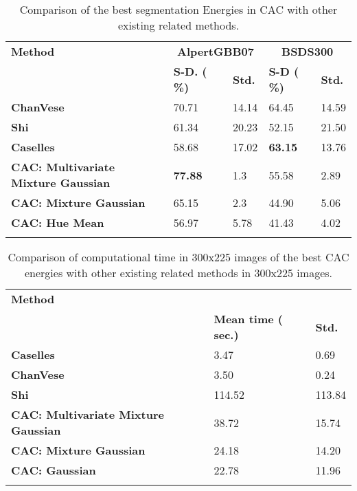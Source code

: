 \begin{table}[h!]
	\centering
	\begin{tabular}{lllll}
		\toprule
		\textbf{Method} & \multicolumn{2}{c}{\textbf{AlpertGBB07}} & \multicolumn{2}{c}{\textbf{BSDS300}} \\
		& \textbf{S-D. ( \%)} & \textbf{Std.}  & \textbf{S-D ( \%)} & \textbf{Std.}  \\ \midrule
		\textbf{ChanVese} & 70.71 & 14.14 &  64.45  &  14.59 \\
		\textbf{Shi} & 61.34 & 20.23 &  52.15  & 21.50\\
		\textbf{Caselles} & 58.68 & 17.02 &  \textbf{63.15}  &  13.76 \\
		\textbf{CAC: Multivariate Mixture Gaussian} & \textbf{77.88}& 1.3    &     55.58  &  2.89     \\
		\textbf{CAC: Mixture Gaussian} &  65.15 &   2.3    &  44.90  &  5.06  \\
		\textbf{CAC: Hue Mean} & 56.97 & 5.78 & 41.43  & 4.02 \\
		\vspace{0.5em}
	\end{tabular}
	\caption{Comparison of the best segmentation Energies in CAC with other existing related methods.}
	\label{table:results}
\end{table}

\begin{table}[h!]
	\centering
	\begin{tabular}{lll}
		\toprule
		\textbf{Method}& & \\
		& \textbf{Mean time ( sec.)} & \textbf{Std.}   \\ \midrule
		\textbf{Caselles} & 3.47 & 0.69 \\ %
		\textbf{ChanVese} & 3.50 & 0.24 \\ %
		\textbf{Shi} & 114.52 & 113.84  \\ %
		\textbf{CAC: Multivariate Mixture Gaussian} & 38.72 & 15.74 \\
		\textbf{CAC: Mixture Gaussian} & 24.18 & 14.20 \\ 
		\textbf{CAC: Gaussian} & 22.78 & 11.96 \\
		\vspace{0.5em}
	\end{tabular}
	\caption{Comparison of computational time  in 300x225  images of the best CAC energies with other existing related methods in 300x225  images.}
	\label{table:computational_time_other}
\end{table}

